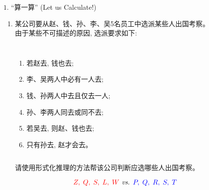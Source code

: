 \begin{frame}{}
  \begin{exampleblock}{$1.$ ``算一算'' (Let us Calculate!)}	
    \begin{enumerate}[(1)]
      \item 某公司要从赵、钱、孙、李、吴5名员工中选派某些人出国考察。\\
	由于某些不可描述的原因, 选派要求如下:

	\begin{columns}
	    \begin{enumerate}[(1)]
	      \item 若赵去, 钱也去;
	      \item 李、吴两人中必有一人去; 
	      \item 钱、孙两人中去且仅去一人; 
	      \item 孙、李两人同去或同不去; 
	      \item 若吴去, 则赵、钱也去;
	      \item 只有孙去, 赵才会去。
	    \end{enumerate}
      \end{columns}

      \vspace{0.20cm}
      请使用形式化推理的方法帮该公司判断应选哪些人出国考察。
    \end{enumerate}
  \end{exampleblock}

  \pause
  \vspace{0.30cm}
  \[
    \textcolor{red}{Z,\; Q,\; S,\; L,\; W} \emph{ vs. } \textcolor{blue}{P,\; Q,\; R,\; S,\; T\;}
  \]
\end{frame}

% 

